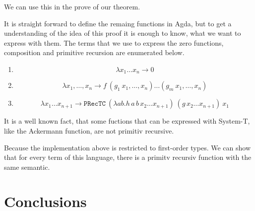 \documentclass{jfp}
\newcommand{\xn}{x_1,\dots,x_n }
\begin{document}
We can use this in the prove of our theorem.
\prToStProj
\embedPRSTSoundProj

It is straight forward to define the remaing functions in Agda, but to get a understanding of the idea of this proof it is enough to know, what we want to express with them. The terms that we use to express the zero functions, composition and primitive recursion are enumerated below.

\begin{enumerate}
	\item $$\lambda x_1 \dots x_{n} \rightarrow 0 $$
	\item $$\lambda \xn \rightarrow  f \ (g_1 \ \xn) \dots (g_m \ \xn) $$
	\item $$\lambda x_1 \dots x_{n+1} \rightarrow \mathtt{PRecTC} \ (\lambda a b . h \, a \, b \, x_2 \dots x_{n+1}) \ (g \, x_2 \dots x_{n+1}) \ x_1 $$
\end{enumerate}


It is a well known fact, that some fuctions that can be expressed with System-T, like the Ackermann function, are not primitiv recursive. 

Because the implementation above is restricted to first-order types. We can show that for every term of this language, there is a primitv recursiv function with the same semantic. 

%




\section{Conclusions}
\label{sec:conclusions}




\label{lastpage01}
\end{document}
